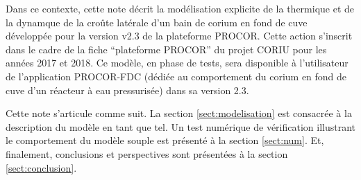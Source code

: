 Dans ce contexte, cette note décrit la modélisation explicite de la thermique et de la dynamque de la croûte latérale d'un bain de corium en fond de cuve développée pour la version v2.3 de la plateforme PROCOR. Cette action s'inscrit dans le cadre de la fiche ``plateforme PROCOR'' du projet CORIU pour les années 2017 et 2018. Ce modèle, en phase de tests, sera disponible à l'utilisateur de l'application PROCOR-FDC (dédiée au comportement du corium en fond de cuve d'un réacteur à eau pressurisée) dans sa version 2.3.

Cette note s'articule comme suit. La section \ref{sect:modelisation} est consacrée à la description du modèle en tant que tel. Un test numérique de vérification illustrant le comportement du modèle souple est présenté à la section \ref{sect:num}. Et, finalement, conclusions et perspectives sont présentées à la section \ref{sect:conclusion}.
